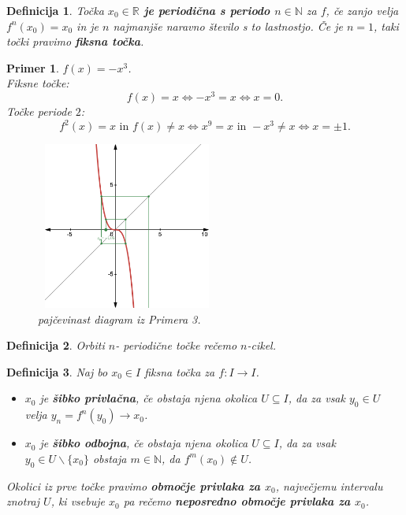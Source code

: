 \documentclass{article}
\newtheorem{definicija}{Definicija}
\newtheorem{primer}{Primer}
\newcommand{\N}{\mathbb{N}}
\newcommand{\R}{\mathbb{R}}
\begin{document}
\begin{definicija}
Točka \textbf{$x_0 \in \R$ je periodična s periodo $n\in \N$} za $f$, če zanjo velja $f^n(x_0) = x_0$ in je $n$ najmanjše naravno število s to lastnostjo. Če je $n=1$, taki točki pravimo \textbf{fiksna točka}.
\end{definicija}

\begin{primer}
$f(x) = -x^3$. \\ 
Fiksne točke: 
$$f(x) = x \iff -x^3 = x \iff x = 0.$$ 
Točke periode $2$: $$f^2(x) = x \text{ in } f(x) \neq x \iff x^9 = x \text{ in } -x^3 \neq x\iff x = \pm 1.$$


\begin{figure}[h!]
    \begin{centering}
        \includegraphics[width=6cm, height=5.5cm]{Grafi/cobweb3.png}
        \caption{pajčevinast diagram iz Primera 3.}
    \end{centering}
    \end{figure}    
\end{primer}

\begin{definicija}
Orbiti $n$- periodične točke rečemo $n$-cikel.
\end{definicija}

\newpage
\begin{definicija}
Naj bo $x_0 \in I$ fiksna točka za $f:I \rightarrow I$.
\begin{itemize}
\item $x_0$ je \textbf{šibko privlačna}, če obstaja njena okolica $U\subseteq I$, da za vsak $y_0 \in U$ velja $y_n = f^n(y_0) \rightarrow x_0$.
\item $x_0$ je \textbf{šibko odbojna}, če obstaja njena okolica $U\subseteq I$, da za vsak $y_0 \in U\backslash\{x_0\}$ obstaja $m\in \N$, da $f^m(x_0) \not\in U$.
\end{itemize}
Okolici iz prve točke pravimo \textbf{območje privlaka za $x_0$}, največjemu intervalu znotraj $U$, ki vsebuje $x_0$ pa rečemo \textbf{neposredno območje privlaka za $x_0$}.\\ 
\end{definicija}
\end{document}
